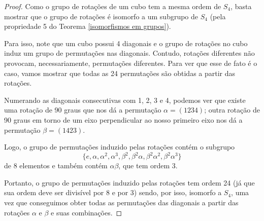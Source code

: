 	\begin{proof}
		Como o grupo de rotações de um cubo tem a mesma ordem de $S_4$, 
		basta mostrar que o grupo de rotações é isomorfo a um subgrupo de
		$S_4$ (pela propriedade 5 do Teorema \ref{isomorfismos em grupos}).
		\par\vspace{0.3cm} Para isso, note que um cubo possui 4 diagonais 
		e o grupo de rotações no cubo induz um grupo de permutações nas
		diagonais. Contudo, rotações diferentes não provocam, 
		necessariamente, permutações diferentes. Para ver que esse de fato 
		é o caso, vamos mostrar que todas as 24 permutações são obtidas a
		partir das rotações.
		\par\vspace{0.3cm} Numerando as diagonais consecutivas com 
		1, 2, 3 e 4, podemos ver que existe uma rotação de 90 graus que nos 
		dá a permutação $\alpha = (1234)$; outra rotação de 90 graus em torno
		de um eixo perpendicular ao nosso primeiro eixo nos dá a 
		permutação $\beta = (1423)$.
		\par\vspace{0.3cm} Logo, o grupo de permutações induzido pelas
		rotações contém o subgrupo 
		\begin{equation*}
		    \{e, \alpha, \alpha^2, \alpha^3, \beta^2, \beta^2\alpha,
		    \beta^2\alpha^2, \beta^2\alpha^3\}
		\end{equation*}
		de 8 elementos e também contém $\alpha\beta$, que tem ordem 3.
		\par\vspace{0.3cm} Portanto, o grupo de permutações induzido pelas
		rotações tem ordem 24 (já que sua ordem deve ser divisível por 8 e 
		por 3) sendo, por isso, isomorfo a $S_4$, uma vez que conseguimos
		obter todas as permutações das diagonais a partir das rotações
		$\alpha$ e $\beta$ e suas combinações. 
	\end{proof}
